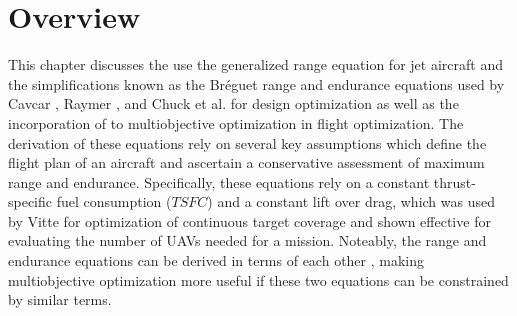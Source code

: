 \section{Overview}
\hspace{0.5cm} This chapter discusses the use the generalized range equation for jet aircraft and the simplifications known as the Br\'eguet range and endurance equations used by  Cavcar \cite{breguetRangeEqn}, Raymer \cite{LoiterTimeFromRange}, and Chuck et al. \cite{fuelsLOGRange} for design optimization as well as the incorporation of to multiobjective optimization in flight optimization. The derivation of these equations rely on several key assumptions which define the flight plan of an aircraft and ascertain a conservative assessment of maximum range and endurance. Specifically, these equations rely on a constant thrust-specific fuel consumption ($TSFC$) and a constant lift over drag, which was used by Vitte \cite{OptimizeBreguet} for optimization of continuous target coverage and shown effective for evaluating the number of UAVs needed for a mission. Noteably, the range and endurance equations can be derived in terms of each other \cite{LoiterTimeFromRange}, making multiobjective optimization more useful if these two equations can be constrained by similar terms. 

